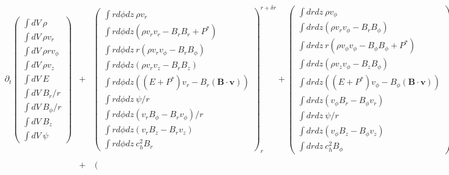 \documentclass[landscape]{article}
\begin{document}
\begin{eqnarray*}
  \partial_t  \left(
  \begin{array}{c}
    \int dV \ \rho\\
    \int dV \ \rho v_r\\
    \int dV \ \rho r v_{\phi}\\
    \int dV \ \rho v_z\\
    \int dV \ E\\
    \int dV \ B_r/r\\
    \int dV \ B_{\phi}/r\\
    \int dV \ B_z\\
    \int dV \ \psi
  \end{array}
  \right)
  &+&   \left(
  \begin{array}{c}
    \int r d\phi dz \ \rho v_r\ \\
    \int r d\phi dz (\rho v_r v_r - B_r B_r + P^*)\\
    \int r d\phi dz \ r(\rho v_r v_{\phi} - B_r B_{\phi})\\
    \int r d\phi dz (\rho v_r v_z - B_r B_z)\\
    \int r d\phi dz ((E+P^*)v_r - B_r(\mathbf{B}\cdot\mathbf{v}))\\
    \int r d\phi dz \ \psi/r\\
    \int r d\phi dz (v_r B_{\phi} - B_r v_{\phi})/r\\
    \int r d\phi dz (v_r B_z - B_r v_z)\\
    \int r d\phi dz \ c_h^2 B_r
    \end{array}
  \right)^{r+\delta r}_r + \left(
    \begin{array}{c}
      \int dr dz \ \rho v_{\phi}\\
      \int dr dz (\rho v_r v_{\phi} - B_r B_{\phi})\\
      \int dr dz \ r(\rho v_{\phi} v_{\phi} - B_{\phi} B_{\phi} + P^* )\\
      \int dr dz (\rho v_z v_{\phi} - B_z B_{\phi})\\
      \int dr dz ((E+P^*)v_{\phi}-B_{\phi}(\mathbf{B}\cdot\mathbf{v}))\\
      \int dr dz (v_{\phi}B_r-B_{\phi}v_r)\\
      \int dr dz \ \psi/r\\
      \int dr dz (v_{\phi}B_z-B_{\phi}v_z)\\
      \int dr dz \ c_h^2 B_{\phi}
    \end{array}
    \right)^{\phi + \delta \phi}_{\phi}\\
    &+& \left(

\end{eqnarray*}
\end{document}
